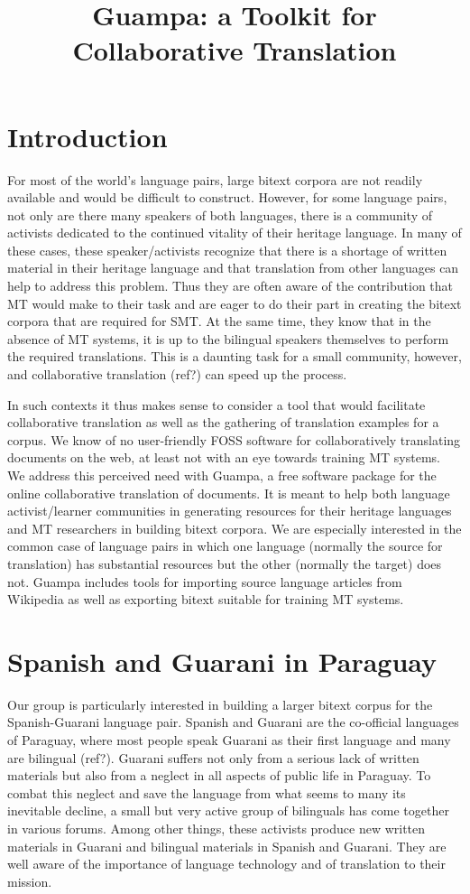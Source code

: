 \documentclass[10pt, a4paper]{article}
\title{Guampa: a Toolkit for Collaborative Translation}
\begin{document}
\maketitleabstract

\section{Introduction}
For most of the world's language pairs, large bitext corpora are not readily
available and would be difficult to construct. However, for some language
pairs, not only are there many speakers of both languages, there is a community
of activists dedicated to the continued vitality of their heritage language. In
many of these cases, these speaker/activists recognize that there is a shortage
of written material in their heritage language and that translation from other
languages can help to address this problem. Thus they are often aware of the
contribution that MT would make to their task and are eager to do their part in
creating the bitext corpora that are required for SMT. At the same time, they
know that in the absence of MT systems, it is up to the bilingual speakers
themselves to perform the required translations. This is a daunting task for a
small community, however, and collaborative translation (ref?) can speed up the
process.

In such contexts it thus makes sense to consider a tool that would facilitate
collaborative translation as well as the gathering of translation examples for
a corpus. We know of no user-friendly FOSS software for collaboratively
translating documents on the web, at least not with an eye towards training MT
systems. We address this perceived need with Guampa, a free software package
for the online collaborative translation of documents. It is meant to help both
language activist/learner communities in generating resources for their
heritage languages and MT researchers in building bitext corpora. We are
especially interested in the common case of language pairs in which one
language (normally the source for translation) has substantial resources but
the other (normally the target) does not. Guampa includes tools for importing
source language articles from Wikipedia as well as exporting bitext suitable
for training MT systems.

\section{Spanish and Guarani in Paraguay}
Our group is particularly interested in building a larger bitext corpus for the
Spanish-Guarani language pair. Spanish and Guarani are the co-official
languages of Paraguay, where most people speak Guarani as their first language
and many are bilingual (ref?). Guarani suffers not only from a serious lack of
written materials but also from a neglect in all aspects of public life in
Paraguay. To combat this neglect and save the language from what seems to many
its inevitable decline, a small but very active group of bilinguals has come
together in various forums. Among other things, these activists produce new
written materials in Guarani and bilingual materials in Spanish and Guarani.
They are well aware of the importance of language technology and of translation
to their mission.
\end{document}
